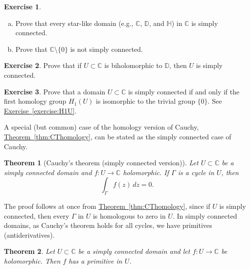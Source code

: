 \documentclass[12pt,openany]{book}
\newcommand{\C}{{\mathbb{C}}}
\newcommand{\D}{{\mathbb{D}}}
\newcommand{\bH}{{\mathbb{H}}}
\theoremstyle{plain}
\newtheorem{thm}{Theorem}[section]
\theoremstyle{remark}
\theoremstyle{definition}
\newenvironment{exbox}{%
    \def\FrameCommand{\vrule width 1pt \relax\hspace{10pt}}%
    \MakeFramed{\advance\hsize-\width\FrameRestore}%
}{%
    \endMakeFramed
}
\newenvironment{exparts}{%
    \leavevmode\begin{enumerate}[a),noitemsep,topsep=0pt,parsep=0pt,partopsep=0pt]
}{%
    \end{enumerate}
}
\theoremstyle{exercise}
\newtheorem{exercise}{Exercise}[section]
\theoremstyle{example}
\newcommand{\exerciseref}[1]{\hyperref[#1]{Exercise~\ref*{#1}}}
\newcommand{\thmref}[1]{\hyperref[#1]{Theorem~\ref*{#1}}}
\begin{document}
\begin{exbox}
\begin{exercise}
\begin{exparts}
\item
Prove that every star-like domain (e.g., $\C$, $\D$, and $\bH$) in $\C$ is simply connected.
\item
Prove that $\C \setminus \{ 0 \}$ is not simply connected.
\end{exparts}
\end{exercise}

\begin{exercise}
Prove that if $U \subset \C$ is biholomorphic to $\D$, then $U$
is simply connected.
\end{exercise}

\begin{exercise}
Prove that a domain $U \subset \C$ is simply connected if and only if
the first homology group
$H_1(U)$ is isomorphic to the trivial group $\{ 0 \}$.
See \exerciseref{exercise:H1U}.
\end{exercise}
\end{exbox}

A special (but common) case of the homology version of Cauchy,
\thmref{thm:CThomology}, can be stated as the simply connected case of Cauchy.

\begin{thm}[Cauchy's theorem (simply connected version)]
%
Let $U \subset \C$ be a simply connected domain and $f \colon U \to \C$
holomorphic.  If $\Gamma$ is a cycle in $U$, then
\begin{equation*}
\int_\Gamma f(z) \, dz = 0 .
\end{equation*}
\end{thm}

The proof follows at once from \thmref{thm:CThomology},
since if $U$ is simply connected, then
every $\Gamma$ in $U$ is homologous to zero in $U$.
In simply connected domains,
as Cauchy's theorem holds for all cycles,
we have primitives (antiderivatives).

\begin{thm}
Let $U \subset \C$ be a simply connected domain and
let $f \colon U \to \C$ be holomorphic.  Then $f$ has a
primitive in $U$.
\end{thm}
\end{document}
